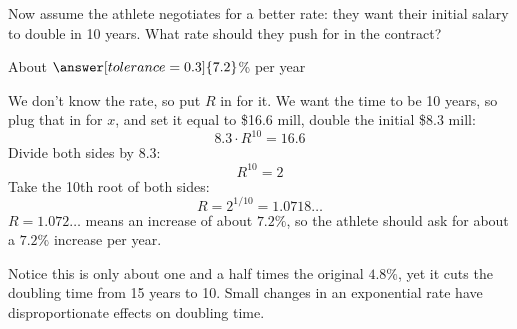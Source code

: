 \documentclass[12pt]{ximera}
\begin{document}
\begin{problem}
Now assume the athlete negotiates for a better rate: they want their initial salary to
double in 10 years. What rate should they push for in the contract?

About $\answer[tolerance=0.3]{7.2}$\% per year

\begin{freeResponse}
\end{freeResponse}

\begin{solution}
We don't know the rate, so put $R$ in for it. We want the time to be 10 years, so plug
that in for $x$, and set it equal to \$16.6 mill, double the initial \$8.3 mill:
\[
8.3 \cdot R^{10} = 16.6
\]
Divide both sides by 8.3:
\[
R^{10} = 2
\]
Take the 10th root of both sides:
\[
R = 2^{1/10} = 1.0718\ldots
\]
$R = 1.072\ldots$ means an increase of about $7.2\%$, so the athlete should ask for about
a $7.2\%$ increase per year.

Notice this is only about one and a half times the original $4.8\%$, yet it cuts the
doubling time from 15 years to 10. Small changes in an exponential rate have
disproportionate effects on doubling time.
\end{solution}
\end{problem}
\end{document}
